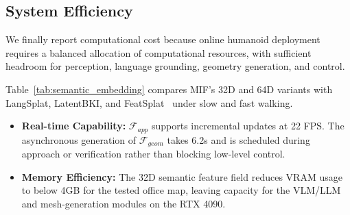 \documentclass[conference]{IEEEtran}
\begin{document}
\subsection{System Efficiency}


\label{sec:exp_performance}
%
We finally report computational cost because online humanoid deployment requires a balanced allocation of computational resources, with sufficient headroom for perception, language grounding, geometry generation, and control.

Table~\ref{tab:semantic_embedding} compares MIF's 32D and 64D variants with LangSplat, LatentBKI, and FeatSplat~\cite{qiu2024featuresplatting} under slow and fast walking.

\begin{table}[h]
    \centering
    \caption{Semantic localization under slow (S-) and fast (F-) walk conditions, memory usage, and latency.}
    \label{tab:semantic_embedding}
    \setlength{\tabcolsep}{3pt}
\end{table}
    

\begin{itemize}
    \item \textbf{Real-time Capability:} $\mathcal{F}_{app}$ supports incremental updates at 22 FPS. The asynchronous generation of $\mathcal{F}_{geom}$ takes 6.2s and is scheduled during approach or verification rather than blocking low-level control.
    \item \textbf{Memory Efficiency:} The 32D semantic feature field reduces VRAM usage to below 4GB for the tested office map, leaving capacity for the VLM/LLM and mesh-generation modules on the RTX 4090.
\end{itemize}
\end{document}
